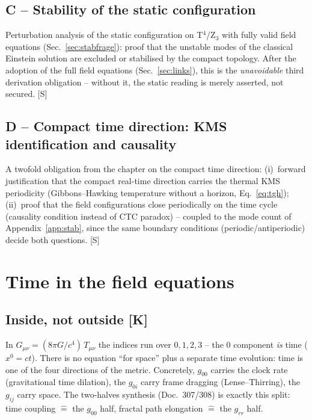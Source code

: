 \section{C -- Stability of the static configuration}

Perturbation analysis of the static configuration on T$^4$/Z$_3$
with fully valid field equations (Sec.~\ref{sec:stabfrage}): proof that the unstable
modes of the classical Einstein solution are excluded or stabilised
by the compact topology. After the adoption of the full field
equations (Sec.~\ref{sec:links}), this is the \emph{unavoidable} third
derivation obligation -- without it, the static reading is merely
asserted, not secured. [S]

\section{D -- Compact time direction: KMS identification and
causality}

A twofold obligation from the chapter on the compact time
direction: (i)~forward justification that the compact real-time
direction carries the thermal KMS periodicity (Gibbons--Hawking
temperature without a horizon, Eq.~\eqref{eq:tgh});
(ii)~proof that the field configurations close periodically on the
time cycle (causality condition instead of CTC paradox) -- coupled
to the mode count of Appendix~\ref{app:stab}, since the same boundary
conditions (periodic/antiperiodic) decide both questions. [S]

\chapter{Time in the field equations}

\section{Inside, not outside [K]}

In $G_{\mu\nu} = (8\pi G/c^4)\,T_{\mu\nu}$ the indices run over
$0,1,2,3$ -- the $0$ component \emph{is} time ($x^0 = ct$). There is
no equation \enquote{for space} plus a separate time evolution:
time is one of the four directions of the metric. Concretely,
$g_{00}$ carries the clock rate (gravitational time dilation), the
$g_{0i}$ carry frame dragging (Lense--Thirring), the $g_{ij}$ carry
space. The two-halves synthesis (Doc.~307/308) is exactly this
split: time coupling $\hat{=}$ the $g_{00}$ half, fractal path
elongation $\hat{=}$ the $g_{rr}$ half.

